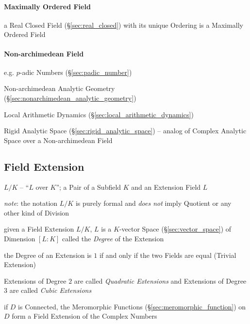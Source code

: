 \paragraph{Maximally Ordered Field}\label{sec:maximally_ordered_field}\hfill

a Real Closed Field (\S\ref{sec:real_closed}) with its unique Ordering is a
Maximally Ordered Field



\paragraph{Non-archimedean Field}\label{sec:nonarchimedean_field}\hfill

e.g. $p$-adic Numbers (\S\ref{sec:padic_number})

\fist Non-archimedean Analytic Geometry
(\S\ref{sec:nonarchimedean_analytic_geometry})

\fist Local Arithmetic Dynamics (\S\ref{sec:local_arithmetic_dynamics})

\fist Rigid Analytic Space (\S\ref{sec:rigid_analytic_space}) -- analog of
Complex Analytic Space over a Non-archimedean Field



\subsection{Field Extension}\label{sec:field_extension}

$L/K$ -- ``$L$ over $K$''; a Pair of a Subfield $K$ and an Extension Field $L$

\emph{note}: the notation $L/K$ is purely formal and \emph{does not} imply
Quotient or any other kind of Division

given a Field Extension $L/K$, $L$ is a $K$-vector Space
(\S\ref{sec:vector_space}) of Dimension $[L:K]$ called the \emph{Degree} of
the Extension

the Degree of an Extension is $1$ if and only if the two Fields are equal
(Trivial Extension)

Extensions of Degree $2$ are called \emph{Quadratic Extensions} and Extensions
of Degree $3$ are called \emph{Cubic Extensions}

if $D$ is Connected, the Meromorphic Functions
(\S\ref{sec:meromorphic_function}) on $D$ form a Field Extension of the Complex
Numbers



